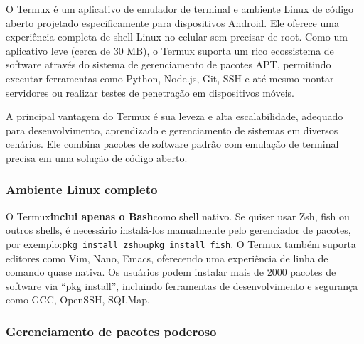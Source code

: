 


O Termux é um aplicativo de emulador de terminal e ambiente Linux de código aberto projetado especificamente para dispositivos Android. Ele oferece uma experiência completa de shell Linux no celular sem precisar de root. Como um aplicativo leve (cerca de 30 MB), o Termux suporta um rico ecossistema de software através do sistema de gerenciamento de pacotes APT, permitindo executar ferramentas como Python, Node.js, Git, SSH e até mesmo montar servidores ou realizar testes de penetração em dispositivos móveis.

A principal vantagem do Termux é sua leveza e alta escalabilidade, adequado para desenvolvimento, aprendizado e gerenciamento de sistemas em diversos cenários. Ele combina pacotes de software padrão com emulação de terminal precisa em uma solução de código aberto.


\subsubsection*{Ambiente Linux completo}

O Termux\textbf{inclui apenas o Bash}como shell nativo. Se quiser usar Zsh, fish ou outros shells, é necessário instalá-los manualmente pelo gerenciador de pacotes, por exemplo:\texttt{pkg install zsh}ou\texttt{pkg install fish}. O Termux também suporta editores como Vim, Nano, Emacs, oferecendo uma experiência de linha de comando quase nativa. Os usuários podem instalar mais de 2000 pacotes de software via “pkg install”, incluindo ferramentas de desenvolvimento e segurança como GCC, OpenSSH, SQLMap.

\subsubsection*{Gerenciamento de pacotes poderoso}

